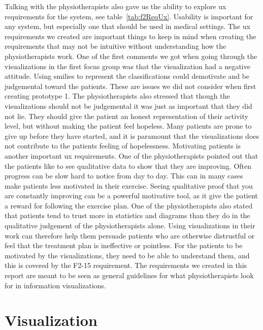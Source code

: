Talking with the physiotherapists also gave us the ability to explore \gls{ux} requirements for the system, see table~\ref{tab:f2ReqUx}. Usability is important for any system, but especially one that should be used in medical settings. %
The \gls{ux} requirements we created are important things to keep in mind when creating the requirements that may not be intuitive without understanding how the physiotherapists work. One of the first comments we got when going through the visualizations in the first focus group was that the visualization had a negative attitude. Using smilies to represent the classifications could demotivate and be judgemental toward the patients. These are issues we did not consider when first creating prototype 1. The physiotherapists also stressed that though the visualizations should not be judgemental it was just as important that they did not lie. They should give the patient an honest representation of their activity level, but without making the patient feel hopeless. Many patients are prone to give up before they have started, and it is paramount that the visualizations does not contribute to the patients feeling of hopelessness. Motivating patients is another important \gls{ux} requirements. One of the physiotherapists pointed out that the patients like to see qualitative data to show that they are improving. Often progress can be slow hard to notice from day to day. This can in many cases make patients less motivated in their exercise. Seeing qualitative proof that you are constantly improving can be a powerful motivative tool, as it give the patient a reward for following the exercise plan. One of the physiotherapists also stated that patients tend to trust more in statistics and diagrams than they do in the qualitative judgement of the physiotherapists alone. Using visualizations in their work can therefore help them persuade patients who are otherwise distrustful or feel that the treatment plan is ineffective or pointless. For the patients to be motivated by the visualizations, they need to be able to understand them, and this is covered by the F2-15 requirement. 
The requirements we created in this report are meant to be seen as general guidelines for what physiotherapists look for in information visualizations. 

\section{Visualization}
